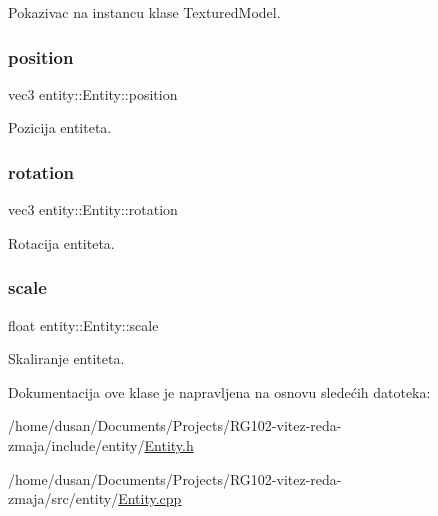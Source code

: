 Pokazivac na instancu klase Textured\+Model. 

\mbox{\label{classentity_1_1Entity_ad409c7f2085024479b276c2b6948bddb}} 
\subsubsection{\texorpdfstring{position}{position}}
{\footnotesize\ttfamily vec3 entity\+::\+Entity\+::position\hspace{0.3cm}{\ttfamily [private]}}



Pozicija entiteta. 

\mbox{\label{classentity_1_1Entity_aedb4c5dc1cfbc8cb3f6deb565ea920cb}} 
\subsubsection{\texorpdfstring{rotation}{rotation}}
{\footnotesize\ttfamily vec3 entity\+::\+Entity\+::rotation\hspace{0.3cm}{\ttfamily [private]}}



Rotacija entiteta. 

\mbox{\label{classentity_1_1Entity_a59e5d5e3575df70cd5c74b5d739d84ca}} 
\subsubsection{\texorpdfstring{scale}{scale}}
{\footnotesize\ttfamily float entity\+::\+Entity\+::scale\hspace{0.3cm}{\ttfamily [private]}}



Skaliranje entiteta. 



Dokumentacija ove klase je napravljena na osnovu sledećih datoteka\+:\begin{DoxyCompactItemize}
\item 
/home/dusan/\+Documents/\+Projects/\+R\+G102-\/vitez-\/reda-\/zmaja/include/entity/\hyperlink{Entity_8h}{Entity.\+h}\item 
/home/dusan/\+Documents/\+Projects/\+R\+G102-\/vitez-\/reda-\/zmaja/src/entity/\hyperlink{Entity_8cpp}{Entity.\+cpp}\end{DoxyCompactItemize}
